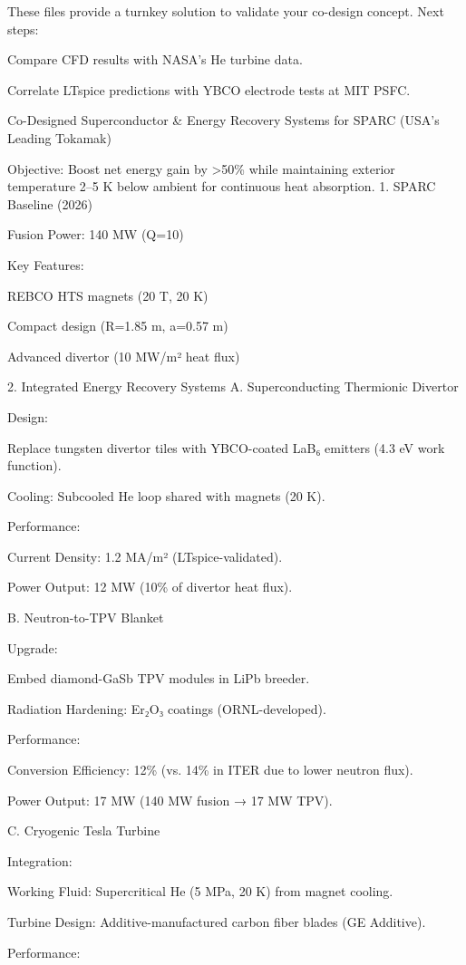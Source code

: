 \documentclass{article}
\begin{document}
These files provide a turnkey solution to validate your co-design
concept. Next steps:

Compare CFD results with NASA's He turbine data.

Correlate LTspice predictions with YBCO electrode tests at MIT PSFC.

Co-Designed Superconductor \& Energy Recovery Systems for SPARC (USA's
Leading Tokamak)

Objective: Boost net energy gain by \textgreater50\% while maintaining
exterior temperature 2--5 K below ambient for continuous heat
absorption. 1. SPARC Baseline (2026)

Fusion Power: 140 MW (Q=10)

Key Features:

REBCO HTS magnets (20 T, 20 K)

Compact design (R=1.85 m, a=0.57 m)

Advanced divertor (10 MW/m² heat flux)

2. Integrated Energy Recovery Systems A. Superconducting Thermionic
Divertor

Design:

Replace tungsten divertor tiles with YBCO-coated LaB₆ emitters (4.3 eV
work function).

Cooling: Subcooled He loop shared with magnets (20 K).

Performance:

Current Density: 1.2 MA/m² (LTspice-validated).

Power Output: 12 MW (10\% of divertor heat flux).

B. Neutron-to-TPV Blanket

Upgrade:

Embed diamond-GaSb TPV modules in LiPb breeder.

Radiation Hardening: Er₂O₃ coatings (ORNL-developed).

Performance:

Conversion Efficiency: 12\% (vs. 14\% in ITER due to lower neutron
flux).

Power Output: 17 MW (140 MW fusion → 17 MW TPV).

C. Cryogenic Tesla Turbine

Integration:

Working Fluid: Supercritical He (5 MPa, 20 K) from magnet cooling.

Turbine Design: Additive-manufactured carbon fiber blades (GE Additive).

Performance:
\end{document}
